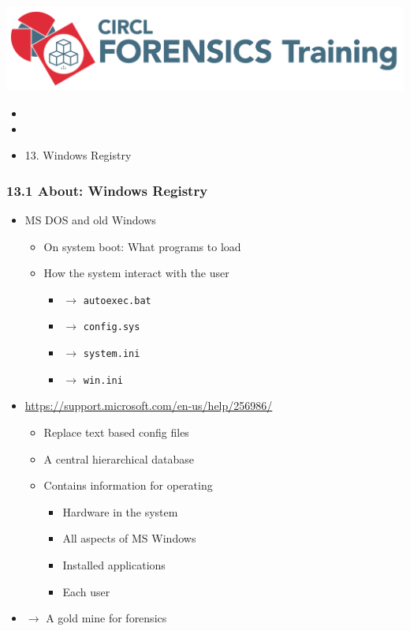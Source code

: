 

\begin{frame}
    \includegraphics[scale=.3]{images/logo-circl-Forensics.png}
    \begin{itemize}
        \item[]
        \item[]
        \item[] 13. Windows Registry
    \end{itemize}
\end{frame}


\begin{frame}[fragile]
  \frametitle{13.1 About: Windows Registry}
    \begin{itemize}
        \item MS DOS and old Windows
            \begin{itemize}
                \item On system boot: What programs to load
                \item How the system interact with the user
                \begin{itemize}
			\item[] $\to$ \texttt{autoexec.bat}
			\item[] $\to$ \texttt{config.sys}
			\item[] $\to$ \texttt{system.ini}
			\item[] $\to$ \texttt{win.ini}
                \end{itemize}
            \end{itemize}
        \item \url{https://support.microsoft.com/en-us/help/256986/}
            \begin{itemize}
                \item Replace text based config files
                \item A central hierarchical database
                \item Contains information for operating
                \begin{itemize}
                    \item Hardware in the system
                    \item All aspects of MS Windows
                    \item Installed applications
                    \item Each user
                \end{itemize}
            \end{itemize}
    \item[] $\to$ A gold mine for forensics
    \end{itemize}
\end{frame}


